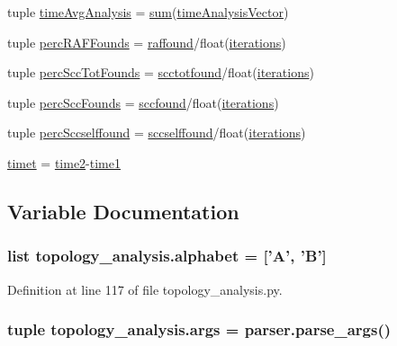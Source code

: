 \begin{DoxyCompactItemize}
tuple \hyperlink{a00157_a0689e49982e7bedba8ac4eb5534963db}{time\-Avg\-Analysis} = \hyperlink{a00106_a59a869fb2b28d56dacd91c09e1dffc8d}{sum}(\hyperlink{a00157_a3ddbda333425be797470f7d058e2c8a4}{time\-Analysis\-Vector})
\item 
tuple \hyperlink{a00157_a51a66ce80f70aeab8bde70af9960e419}{perc\-R\-A\-F\-Founds} = \hyperlink{a00157_ad625a009a3da81a04b490e62975ecf39}{raffound}/float(\hyperlink{a00157_a2117e01e4647cbdecc0ece27cec1cff4}{iterations})
\item 
tuple \hyperlink{a00157_aee49954a6b9abb7c4bd677c17ed4013b}{perc\-Scc\-Tot\-Founds} = \hyperlink{a00157_ac05c0aaedb357a42df2d5f3915bbedfa}{scctotfound}/float(\hyperlink{a00157_a2117e01e4647cbdecc0ece27cec1cff4}{iterations})
\item 
tuple \hyperlink{a00157_a14f23c89de77042b80e78e1d9ab7b754}{perc\-Scc\-Founds} = \hyperlink{a00157_aa8258ef828502be89350332ae97a0d3a}{sccfound}/float(\hyperlink{a00157_a2117e01e4647cbdecc0ece27cec1cff4}{iterations})
\item 
tuple \hyperlink{a00157_a8bf55c62b8e7385526396a9003e343bb}{perc\-Sccselffound} = \hyperlink{a00157_aeacefe088f3283ea0e80ee31c0486d6d}{sccselffound}/float(\hyperlink{a00157_a2117e01e4647cbdecc0ece27cec1cff4}{iterations})
\item 
\hyperlink{a00157_a5b12bbbc66679be171ab082dbaeba90b}{timet} = \hyperlink{a00157_a44666efa43bfc08ab8305c8d325f7456}{time2}-\/\hyperlink{a00157_ac7160059dec8067db4645fa39feec359}{time1}
\end{DoxyCompactItemize}


\subsection{Variable Documentation}
\hypertarget{a00157_ab0d9c13eee214bf78b20760bf2835248}{
\subsubsection[{alphabet}]{\setlength{\rightskip}{0pt plus 5cm}list topology\-\_\-analysis.\-alphabet = \mbox{[}'{\bf A}', '{\bf B}'\mbox{]}}}\label{a00157_ab0d9c13eee214bf78b20760bf2835248}


Definition at line 117 of file topology\-\_\-analysis.\-py.

\hypertarget{a00157_a6741aa05e3fb94565993dd2001401e98}{
\subsubsection[{args}]{\setlength{\rightskip}{0pt plus 5cm}tuple topology\-\_\-analysis.\-args = parser.\-parse\-\_\-args()}}\label{a00157_a6741aa05e3fb94565993dd2001401e98}


